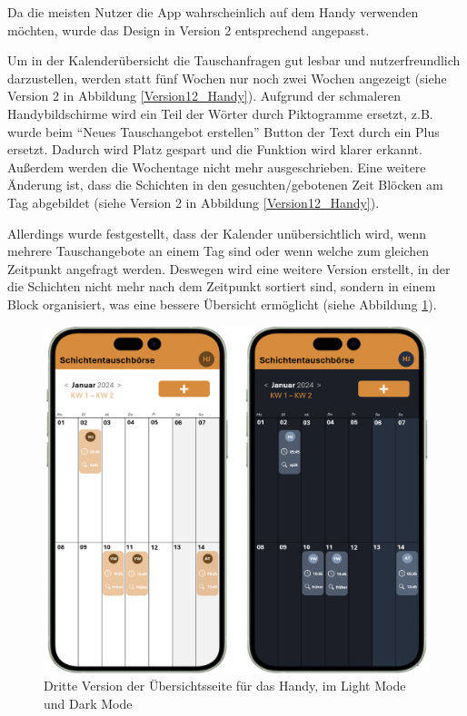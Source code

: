 Da die meisten Nutzer die App wahrscheinlich auf dem Handy verwenden möchten, wurde das Design in Version 2 entsprechend angepasst.

Um in der Kalenderübersicht die Tauschanfragen gut lesbar und nutzerfreundlich darzustellen, werden statt fünf Wochen nur noch zwei Wochen angezeigt (siehe Version 2 in Abbildung \ref{Version12_Handy}). 
Aufgrund der schmaleren Handybildschirme wird ein Teil der Wörter durch Piktogramme ersetzt, z.B. wurde beim “Neues Tauschangebot erstellen” Button der Text durch ein Plus ersetzt. Dadurch wird Platz gespart und die Funktion wird klarer erkannt. 
Außerdem werden die Wochentage nicht mehr ausgeschrieben. Eine weitere Änderung ist, dass die Schichten in den gesuchten/gebotenen Zeit Blöcken am Tag abgebildet (siehe Version 2 in Abbildung \ref{Version12_Handy}).

Allerdings wurde festgestellt, dass der Kalender unübersichtlich wird, wenn mehrere Tauschangebote an einem Tag sind oder wenn welche zum gleichen Zeitpunkt angefragt werden. 
Deswegen wird eine weitere Version erstellt, in der die Schichten nicht mehr nach dem Zeitpunkt sortiert sind, sondern in einem Block organisiert, was eine bessere Übersicht ermöglicht (siehe Abbildung \ref{Version3_Handy}).

\begin{figure}[h]
    \centering
    \includegraphics[clip,width=0.75\linewidth]{images/Version3_Handy.png}
    \caption[Dritte Version der Übersichtsseite für das Handy, im Light Mode und Dark Mode]{Dritte Version der Übersichtsseite für das Handy, im Light Mode und Dark Mode}
    \label{Version3_Handy}
\end{figure}


